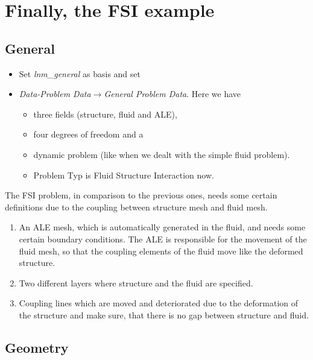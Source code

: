 \section{Finally, the FSI example}


\subsection{General}

\begin{itemize}
\item Set \emph{lnm\_general} as basis and set \emph{}
\item \emph{Data-Problem Data$\to$General Problem Data}. Here we have 

\begin{itemize}
\item three fields (structure, fluid and ALE), 
\item four degrees of freedom and a 
\item dynamic problem (like when we dealt with the simple fluid problem). 
\item Problem Typ is Fluid Structure Interaction now.
\end{itemize}
\end{itemize}
The FSI problem, in comparison to the previous ones, needs some certain
definitions due to the coupling between structure mesh and fluid mesh.

\begin{enumerate}
\item An ALE mesh, which is automatically generated in the fluid, and needs
some certain boundary conditions. The ALE is responsible for the movement
of the fluid mesh, so that the coupling elements of the fluid move
like the deformed structure.
\item Two different layers where structure and the fluid are specified.
\item Coupling lines which are moved and deteriorated due to the deformation
of the structure and make sure, that there is no gap between structure
and fluid.
\end{enumerate}

\subsection{Geometry}

